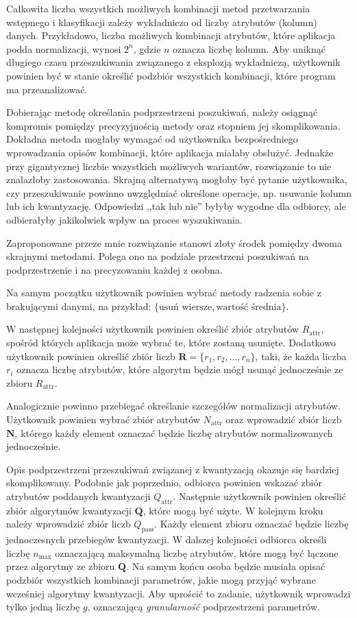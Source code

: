 \documentclass[../thesis.tex]{subfiles}
\begin{document}
Całkowita liczba wszystkich możliwych kombinacji metod przetwarzania wstępnego i klasyfikacji zależy wykładniczo od liczby atrybutów (kolumn) danych. Przykładowo, liczba możliwych kombinacji atrybutów, które aplikacja podda normalizacji, wynosi $2^{n}$, gdzie $n$ oznacza liczbę kolumn. Aby uniknąć długiego czasu przeszukiwania związanego z eksplozją wykładniczą, użytkownik powinien być w stanie określić podzbiór wszystkich kombinacji, które program ma przeanalizować.

Dobierając metodę określania podprzestrzeni poszukiwań, należy osiągnąć kompromis pomiędzy precyzyjnością metody oraz stopniem jej skomplikowania. Dokładna metoda mogłaby wymagać od użytkownika bezpośredniego wprowadzania opisów kombinacji, które aplikacja miałaby obsłużyć. Jednakże przy gigantycznej liczbie wszystkich możliwych wariantów, rozwiązanie to nie znalazłoby zastosowania. Skrajną alternatywą mogłoby być pytanie użytkownika, czy przeszukiwanie powinno uwzględniać określone operacje, np. usuwanie kolumn lub ich kwantyzację. Odpowiedzi ,,tak lub nie'' byłyby wygodne dla odbiorcy, ale odbierałyby jakikolwiek wpływ na proces wyszukiwania.

Zaproponowane przeze mnie rozwiązanie stanowi złoty środek pomiędzy dwoma skrajnymi metodami. Polega ono na podziale przestrzeni poszukiwań na podprzestrzenie i na precyzowaniu każdej z osobna.

Na samym początku użytkownik powinien wybrać metody radzenia sobie z brakującymi danymi, na przykład: $\{\textrm{usuń wiersze}, \textrm{wartość średnia}\}$.

W następnej kolejności użytkownik powinien określić zbiór atrybutów $R_\textrm{attr}$, spośród których aplikacja może wybrać te, które zostaną usunięte. Dodatkowo użytkownik powinien określić zbiór liczb $\textbf{R} = \{r_1, r_2, \ldots, r_n\}$, taki, że każda liczba $r_i$ oznacza liczbę atrybutów, które algorytm będzie mógł usunąć jednocześnie ze zbioru $R_\textrm{attr}$.

Analogicznie powinno przebiegać określanie szczegółów normalizacji atrybutów. Użytkownik powinien wybrać zbiór atrybutów $N_\textrm{attr}$ oraz wprowadzić zbiór liczb $\textbf{N}$, którego każdy element oznaczać będzie liczbę atrybutów normalizowanych jednocześnie.

Opis podprzestrzeni przeszukiwań związanej z kwantyzacją okazuje się bardziej skomplikowany. Podobnie jak poprzednio, odbiorca powinien wskazać zbiór atrybutów poddanych kwantyzacji $Q_\textrm{attr}$. Następnie użytkownik powinien określić zbiór algorytmów kwantyzacji $\textbf{Q}$, które mogą być użyte. W kolejnym kroku należy wprowadzić zbiór liczb $Q_\textrm{pass}$. Każdy element zbioru oznaczać będzie liczbę jednoczesnych przebiegów kwantyzacji. W dalszej kolejności odbiorca określi liczbę $n_\textrm{max}$ oznaczającą maksymalną liczbę atrybutów, które mogą być łączone przez algorytmy ze zbioru $\textbf{Q}$. Na samym końcu osoba będzie musiała opisać podzbiór wszystkich kombinacji parametrów, jakie mogą przyjąć wybrane wcześniej algorytmy kwantyzacji. Aby uprościć to zadanie, użytkownik wprowadzi tylko jedną liczbę $g$, oznaczającą \textit{granularność} podprzestrzeni parametrów. 
\end{document}
